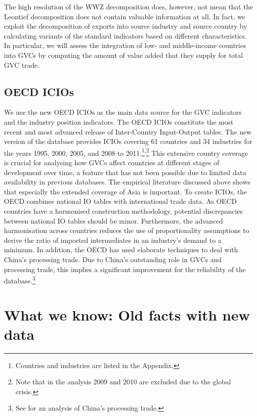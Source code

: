 \documentclass[11pt,a4paper]{article}
\begin{document}
The high resolution of the WWZ decomposition does, however, not mean that the Leontief decomposition does not contain valuable information at all. In fact, we exploit the decomposition of exports into source industry and source country by calculating variants of the standard indicators based on different characteristics. In particular, we will assess the integration of low- and middle-income countries into GVCs by computing the amount of value added that they supply for total GVC trade.


\subsection{OECD ICIOs}\label{sub:icios}
We use the new OECD ICIOs as the main data source for the GVC indicators and the industry position indicators. The OECD ICIOs constitute the most recent and most advanced release of Inter-Country Input-Output tables. The new version of the database provides ICIOs covering 61 countries and 34 industries for the years 1995, 2000, 2005, and 2008 to 2011.\footnote{Countries and industries are listed in the Appendix.}\textsuperscript{,}\footnote{Note that in the analysis 2009 and 2010 are excluded due to the global crisis.} This extensive country coverage is crucial for analysing how GVCs affect countries at different stages of development over time, a feature that has not been possible due to limited data availability in previous databases. The empirical literature discussed above shows that especially the extended coverage of Asia is important. To create ICIOs, the OECD combines national IO tables with international trade data. As OECD countries have a harmonised construction methodology, potential discrepancies between national IO tables should be minor. Furthermore, the advanced harmonisation across countries reduces the use of proportionality assumptions to derive the ratio of imported intermediates in an industry's demand to a minimum. In addition, the OECD has used elaborate techniques to deal with China's processing trade. Due to China's outstanding role in GVCs and processing trade, this implies a significant improvement for the reliability of the database.\footnote{See \citet{rokoetal12} for an analysis of China's processing trade.}



\section{What we know: Old facts with new data}\label{sec:basics}
\end{document}
